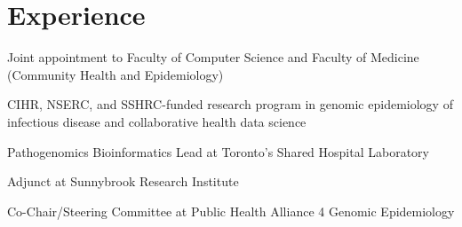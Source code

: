 \documentclass[]{Finlay_Maguire_CV}
\begin{document}
\begin{minipage}[t]{0.66\textwidth} 


\section{Experience}

    \vspace{0.2cm}
\begin{tightemize}
\item Joint appointment to Faculty of Computer Science and Faculty of Medicine (Community Health and Epidemiology)
\item CIHR, NSERC, and SSHRC-funded research program in genomic epidemiology of infectious disease and collaborative health data science
\item Pathogenomics Bioinformatics Lead at Toronto's Shared Hospital Laboratory
\item Adjunct at Sunnybrook Research Institute
\item Co-Chair/Steering Committee at Public Health Alliance 4 Genomic Epidemiology
\end{tightemize}


\end{minipage}
\end{document}
